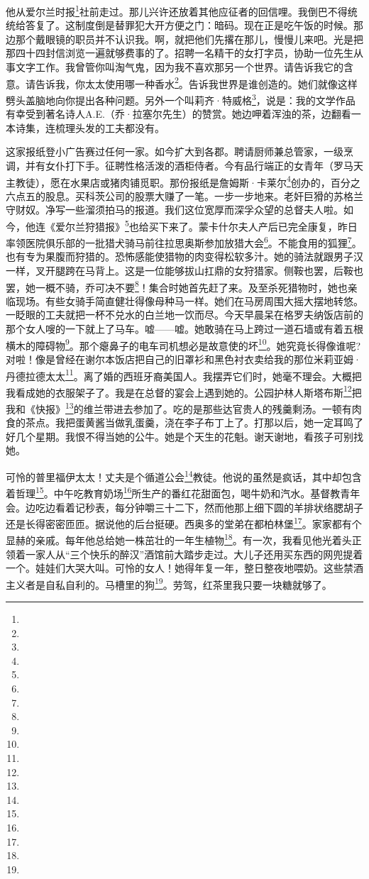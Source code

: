 \par 他从爱尔兰时报\footnote{}社前走过。那儿兴许还放着其他应征者的回信哩。我倒巴不得统统给答复了。这制度倒是替罪犯大开方便之门：暗码。现在正是吃午饭的时候。那边那个戴眼镜的职员并不认识我。啊，就把他们先撂在那儿，慢慢儿来吧。光是把那四十四封信浏览一遍就够费事的了。招聘一名精干的女打字员，协助一位先生从事文字工作。我曾管你叫淘气鬼，因为我不喜欢那另一个世界。请告诉我它的含意。请告诉我，你太太使用哪一种香水\footnote{}。告诉我世界是谁创造的。她们就像这样劈头盖脑地向你提出各种问题。另外一个叫莉齐·特威格\footnote{}，说是：我的文学作品有幸受到著名诗人A.E.（乔·拉塞尔先生）的赞赏。她边呷着浑浊的茶，边翻看一本诗集，连梳理头发的工夫都没有。
\par 这家报纸登小广告赛过任何一家。如今扩大到各郡。聘请厨师兼总管家，一级烹调，并有女仆打下手。征聘性格活泼的酒柜侍者。今有品行端正的女青年（罗马天主教徒），愿在水果店或猪肉铺觅职。那份报纸是詹姆斯·卡莱尔\footnote{}创办的，百分之六点五的股息。买科茨公司的股票大赚了一笔。一步一步地来。老奸巨猾的苏格兰守财奴。净写一些溜须拍马的报道。我们这位宽厚而深孚众望的总督夫人啦。如今，他连《爱尔兰狩猎报》\footnote{}也给买下来了。蒙卡什尔夫人产后已完全康复，昨日率领医院俱乐部的一批猎犬骑马前往拉思奥斯参加放猎大会\footnote{}。不能食用的狐狸\footnote{}。也有专为果腹而狩猎的。恐怖感能使猎物的肉变得松软多汁。她的骑法就跟男子汉一样，叉开腿跨在马背上。这是一位能够拔山扛鼎的女狩猎家。侧鞍也罢，后鞍也罢，她一概不骑，乔可决不要\footnote{}！集合时她首先赶了来。及至杀死猎物时，她也亲临现场。有些女骑手简直健壮得像母种马一样。她们在马房周围大摇大摆地转悠。一眨眼的工夫就把一杯不兑水的白兰地一饮而尽。今天早晨呆在格罗夫纳饭店前的那个女人嗖的一下就上了马车。嘘——嘘。她敢骑在马上跨过一道石墙或有着五根横木的障碍物\footnote{}。那个瘪鼻子的电车司机想必是故意使的坏\footnote{}。她究竟长得像谁呢?对啦！像是曾经在谢尔本饭店把自己的旧罩衫和黑色衬衣卖给我的那位米莉亚姆·丹德拉德太太\footnote{}。离了婚的西班牙裔美国人。我摆弄它们时，她毫不理会。大概把我看成她的衣服架子了。我是在总督的宴会上遇到她的。公园护林人斯塔布斯\footnote{}把我和《快报》\footnote{}的维兰带进去参加了。吃的是那些达官贵人的残羹剩汤。一顿有肉食的茶点。我把蛋黄酱当做乳蛋羹，浇在李子布丁上了。打那以后，她一定耳鸣了好几个星期。我恨不得当她的公牛。她是个天生的花魁。谢天谢地，看孩子可别找她。
\par 可怜的普里福伊太太！丈夫是个循道公会\footnote{}教徒。他说的虽然是疯话，其中却包含着哲理\footnote{}。中午吃教育奶场\footnote{}所生产的番红花甜面包，喝牛奶和汽水。基督教青年会。边吃边看着记秒表，每分钟嚼三十二下，然而他那上细下圆的羊排状络腮胡子还是长得密密匝匝。据说他的后台挺硬。西奥多的堂弟在都柏林堡\footnote{}。家家都有个显赫的亲戚。每年他总给她一株茁壮的一年生植物\footnote{}。有一次，我看见他光着头正领着一家人从“三个快乐的醉汉”酒馆前大踏步走过。大儿子还用买东西的网兜提着一个。娃娃们大哭大叫。可怜的女人！她得年复一年，整日整夜地喂奶。这些禁酒主义者是自私自利的。马槽里的狗\footnote{}。劳驾，红茶里我只要一块糖就够了。
